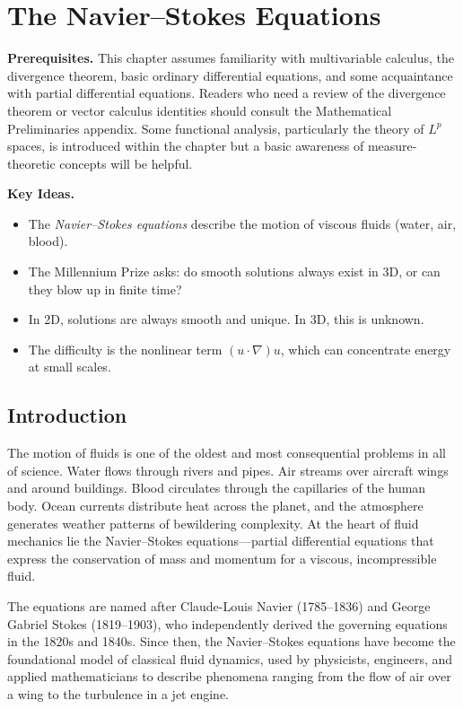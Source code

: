 \chapter{The Navier--Stokes Equations}
\label{ch:navierstokes}

\medskip\noindent\textbf{Prerequisites.} This chapter assumes familiarity with multivariable calculus, the divergence theorem, basic ordinary differential equations, and some acquaintance with partial differential equations. Readers who need a review of the divergence theorem or vector calculus identities should consult the Mathematical Preliminaries appendix. Some functional analysis, particularly the theory of $L^p$ spaces, is introduced within the chapter but a basic awareness of measure-theoretic concepts will be helpful.

\noindent\textbf{Key Ideas.}
\begin{itemize}
  \item The \emph{Navier--Stokes equations} describe the motion of viscous fluids (water, air, blood).
  \item The Millennium Prize asks: do smooth solutions always exist in 3D, or can they blow up in finite time?
  \item In 2D, solutions are always smooth and unique. In 3D, this is unknown.
  \item The difficulty is the nonlinear term $(u \cdot \nabla)u$, which can concentrate energy at small scales.
\end{itemize}

\bigskip

\section{Introduction}
\label{sec:NS-intro}

The motion of fluids is one of the oldest and most consequential problems in all of science. Water flows through rivers and pipes. Air streams over aircraft wings and around buildings. Blood circulates through the capillaries of the human body. Ocean currents distribute heat across the planet, and the atmosphere generates weather patterns of bewildering complexity. At the heart of fluid mechanics lie the Navier--Stokes equations---partial differential equations that express the conservation of mass and momentum for a viscous, incompressible fluid.

The equations are named after Claude-Louis Navier (1785--1836) and George Gabriel Stokes (1819--1903), who independently derived the governing equations in the 1820s and 1840s. Since then, the Navier--Stokes equations have become the foundational model of classical fluid dynamics, used by physicists, engineers, and applied mathematicians to describe phenomena ranging from the flow of air over a wing to the turbulence in a jet engine.

